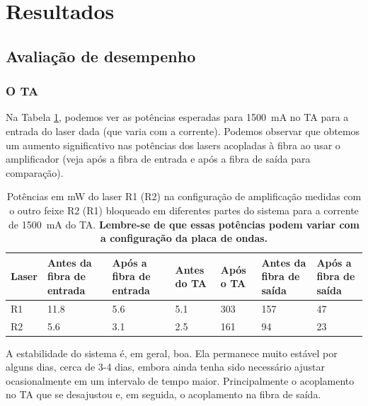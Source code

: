 \section{Resultados}
\subsection{Avaliação de desempenho}
\subsubsection{O \gls{TA}}
Na Tabela \ref{tab:powers}, podemos ver as potências esperadas para \SI{1500}{mA} no \gls{TA} para a entrada do laser dada (que varia com a corrente). Podemos observar que obtemos um aumento significativo nas potências dos lasers acopladas à fibra ao usar o amplificador (veja após a fibra de entrada e após a fibra de saída para comparação).

\begin{table}[]
\begin{tabular}{|p{1.5cm}|p{1.5cm}|p{1.5cm}|p{1.5cm}|p{1.5cm}|p{1.5cm}|p{1.5cm}|}
\hline
Laser & Antes da fibra de entrada & Após a fibra de entrada & Antes do TA & Após o TA & Antes da fibra de saída & Após a fibra de saída \\ \hline
R1    &  11.8               &      5.6             &    5.1       &    303      & 157                    &       47             \\ \hline
R2    &         5.6           &     3.1              &     2.5      &    161      &            94         &         23           \\ \hline
\end{tabular}
\caption{Potências em mW do laser R1 (R2) na configuração de amplificação medidas com o outro feixe R2 (R1) bloqueado em diferentes partes do sistema para a corrente de \SI{1500}{mA} do \gls{TA}. \textbf{Lembre-se de que essas potências podem variar com a configuração da placa de ondas.}}
\label{tab:powers}
\end{table}

A estabilidade do sistema é, em geral, boa. Ela permanece muito estável por alguns dias, cerca de 3-4 dias, embora ainda tenha sido necessário ajustar ocasionalmente em um intervalo de tempo maior. Principalmente o acoplamento no \gls{TA} que se desajustou e, em seguida, o acoplamento na fibra de saída.

